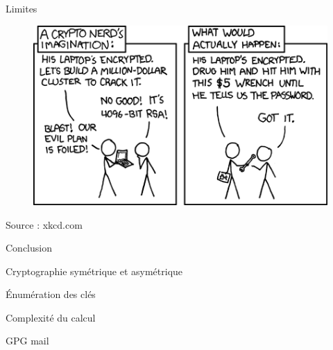 \documentclass{beamer}
\begin{document}
\begin{frame}{Limites}
  \begin{figure}
    \centering
    \includegraphics[scale = 0.5]{xkcdsecurity.png}
  \end{figure}
\footnotesize{Source : xkcd.com}
\end{frame}

\begin{frame}{Conclusion}
  \begin{center}
  Cryptographie symétrique et asymétrique

  Énumération des clés  

  Complexité du calcul
\end{center}

  
  GPG mail

  \end{frame}
\end{document}

